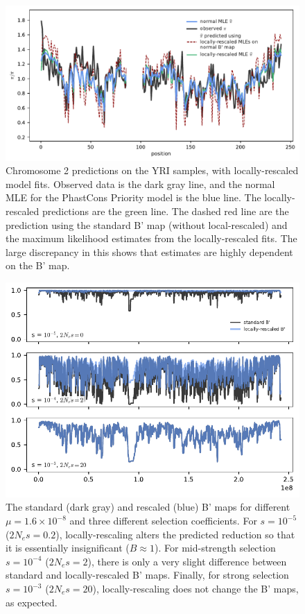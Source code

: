 \documentclass[11pt]{article}
\begin{document}
\begin{figure}[htbp]
    \label{suppfig:rescale}
  \centering
  \includegraphics[]{figures/supplementary/rescale_pi_pred_plot.pdf}

  \caption{Chromosome 2 predictions on the YRI samples, with locally-rescaled
      model fits. Observed data is the dark gray line, and the normal MLE for
      the PhastCons Priority model is the blue line. The locally-rescaled
      predictions are the green line. The dashed red line are the prediction
      using the standard B' map (without local-rescaled) and the maximum likelihood
      estimates from the locally-rescaled fits. The large discrepancy in this shows
      that estimates are highly dependent on the B' map.}
\end{figure}

\begin{figure}[htbp]
    \label{suppfig:rescale-b}
  \centering
  \includegraphics[]{figures/supplementary/rescale_Bs.pdf}

  \caption{The standard (dark gray) and rescaled (blue) B' maps for different
      $\mu = 1.6 \times 10^{-8}$ and three different selection coefficients.
      For $s=10^{-5}$ ($2N_e s = 0.2$), locally-rescaling alters the predicted
      reduction so that it is essentially insignificant ($B \approx 1$). For
  mid-strength selection $s=10^{-4}$ ($2N_e s = 2$), there is only a very
slight difference between standard and locally-rescaled B' maps. Finally, for
strong selection $s=10^{-3}$ ($2N_e s = 20$), locally-rescaling does not change
the B' maps, as expected. }
\end{figure}
\end{document}

